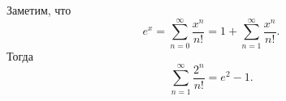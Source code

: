 \documentclass{article}
\begin{document}
Заметим, что
$$e^x = \sum\limits_{n=0}^\infty \frac{x^n}{n!} = 1 + \sum\limits_{n=1}^\infty \frac{x^n}{n!}.$$
Тогда
$$\sum\limits_{n=1}^\infty \frac{2^n}{n!} = e^2 - 1.$$
\end{document}

